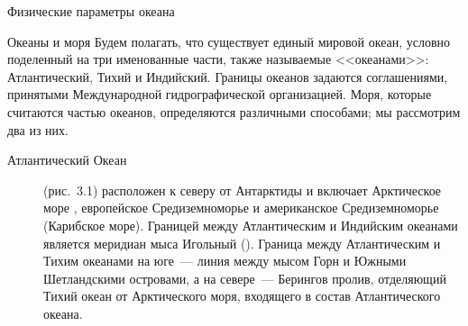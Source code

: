 \begin{chapter}{Физические параметры океана}
\begin{section}{Океаны и моря}
Будем полагать, что существует единый мировой океан, условно поделенный
на три именованные части, также называемые <<океанами>>: Атлантический, 
Тихий и Индийский. Границы океанов задаются соглашениями, принятыми 
Международной гидрографической организацией. Моря, которые считаются 
частью океанов, определяются различными способами; мы рассмотрим два из них. 
%


\begin{description}
\item[Атлантический Океан] (рис.~3.1) расположен к северу от
Антарктиды и включает Арктическое море%
, европейское
Средиземноморье и американское Средиземноморье (Карибское
море). Границей между Атлантическим и Индийским океанами является
меридиан мыса Игольный (). Граница между Атлантическим и Тихим
океанами на юге~--- линия между мысом Горн и Южными Шетландскими
островами, а на севере~--- Берингов пролив, отделяющий Тихий океан от
Арктического моря, входящего в состав Атлантического океана.
%



\end{description}
\end{section}
\end{chapter}
